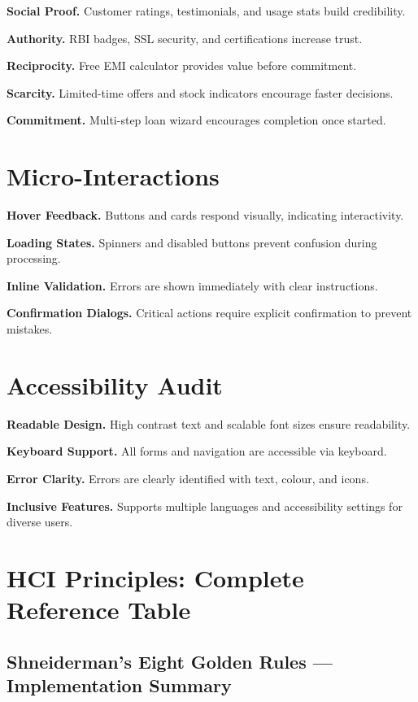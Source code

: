 \documentclass[11pt,a4paper]{article}
\begin{document}
\textbf{Social Proof.}
Customer ratings, testimonials, and usage stats build credibility.

\textbf{Authority.}
RBI badges, SSL security, and certifications increase trust.

\textbf{Reciprocity.}
Free EMI calculator provides value before commitment.

\textbf{Scarcity.}
Limited-time offers and stock indicators encourage faster decisions.

\textbf{Commitment.}
Multi-step loan wizard encourages completion once started.

\section{Micro-Interactions}

\textbf{Hover Feedback.}
Buttons and cards respond visually, indicating interactivity.

\textbf{Loading States.}
Spinners and disabled buttons prevent confusion during processing.

\textbf{Inline Validation.}
Errors are shown immediately with clear instructions.

\textbf{Confirmation Dialogs.}
Critical actions require explicit confirmation to prevent mistakes.

\section{Accessibility Audit}

\textbf{Readable Design.}
High contrast text and scalable font sizes ensure readability.

\textbf{Keyboard Support.}
All forms and navigation are accessible via keyboard.

\textbf{Error Clarity.}
Errors are clearly identified with text, colour, and icons.

\textbf{Inclusive Features.}
Supports multiple languages and accessibility settings for diverse users.
\section{HCI Principles: Complete Reference Table}

\subsection{Shneiderman's Eight Golden Rules — Implementation Summary}
\end{document}
